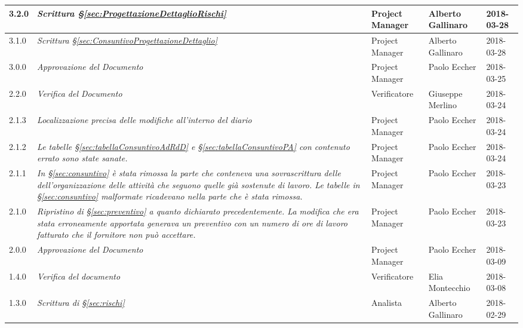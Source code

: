 \begin{longtable}[H]{C{2cm}|C{4cm}|C{3cm}|C{3cm}|R{2cm}}
		3.2.0 &\emph{Scrittura §\ref{sec:ProgettazioneDettaglioRischi}} & Project Manager & Alberto Gallinaro & 2018-03-28 \\
		\hline	
		
		3.1.0 &\emph{Scrittura §\ref{sec:ConsuntivoProgettazioneDettaglio}} & Project Manager & Alberto Gallinaro & 2018-03-28 \\
		\hline
		
		3.0.0 &\emph{Approvazione del Documento} & Project Manager & Paolo Eccher & 2018-03-25 \\
		\hline
		
		2.2.0 &\emph{Verifica del Documento} & Verificatore & Giuseppe Merlino & 2018-03-24 \\
		\hline
		
		2.1.3 &\emph{Localizzazione precisa delle modifiche all'interno del diario} & Project Manager & Paolo Eccher & 2018-03-24 \\
		\hline
		
		2.1.2 &\emph{ Le tabelle §\ref{sec:tabellaConsuntivoAdRdD} e §\ref{sec:tabellaConsuntivoPA} con contenuto errato sono state sanate.} & Project Manager & Paolo Eccher & 2018-03-24 \\
		\hline
		
		2.1.1 &\emph{ In §\ref{sec:consuntivo} è stata rimossa la parte che conteneva una sovrascrittura delle dell'organizzazione delle attività che seguono quelle già sostenute di lavoro. Le  tabelle in §\ref{sec:consuntivo} malformate ricadevano nella parte che è stata rimossa.} & Project Manager & Paolo Eccher & 2018-03-23 \\
		\hline
		
		2.1.0 &\emph{Ripristino di §\ref{sec:preventivo} a quanto dichiarato precedentemente. La modifica che era stata erroneamente apportata generava un preventivo con un numero di ore di lavoro fatturato che il fornitore non può accettare. } & Project Manager & Paolo Eccher & 2018-03-23 \\
		\hline
		
		2.0.0 &\emph{Approvazione del Documento} & Project Manager & Paolo Eccher & 2018-03-09 \\
		\hline
		
		1.4.0 &\emph{Verifica del documento} & Verificatore & Elia Montecchio & 2018-03-08 \\
		\hline
		
		1.3.0 &\emph{Scrittura di §\ref{sec:rischi}} & Analista & Alberto Gallinaro & 2018-02-29 \\
		\hline


\end{longtable}

